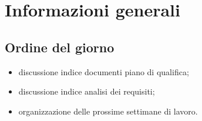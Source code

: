 \section{Informazioni generali}
    \def\modifiche { 
        {Data, 2020-12-16},
        {Ora inizio, 16:10},
        {Ora fine, 17:45},
        {Luogo, Discord},
        {Presenze, \unexpanded{
            \begin{itemize}
                \item Andrea Breggion;
                \item Matteo Falsetti;
                \item Alessandro Flori;
                \item Diego Piola;
                \item Andrea Signori;
                \item Damiano Zanardo.
            \end{itemize}}
        },
    }
    

\subsection{Ordine del giorno}
\begin{itemize}
    \item discussione indice documenti piano di qualifica;
    \item discussione indice analisi dei requisiti;
    \item organizzazione delle prossime settimane di lavoro.
\end{itemize}
